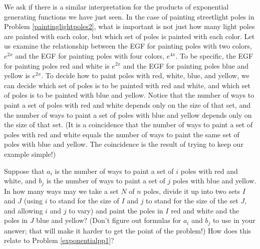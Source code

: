We ask if there is a similar
interpretation for the products of exponential generating functions we
have just seen.  In the case of painting streetlight poles in Problem
\ref{paintinglightpoles2}, what is important is not just how many
light poles are painted with each color, but which set of poles is painted
with each color.  Let us examine the relationship between the EGF for
painting poles with two colors, $e^{2x}$ and the EGF for painting poles
with four colors,
$e^{4x}$.  To be specific, the EGF for painting poles red and white is
$e^{2x}$ and the EGF for painting poles blue and yellow is $e^{2x}$.  To
decide how to paint poles with red, white, blue, and yellow, we can decide
which set of poles is to be painted with red and white, and which set of
poles is to be painted with blue and yellow.  Notice that the number of
ways to paint a set of poles with red and white depends only on the size
of that set, and the number of ways to paint a
set of poles with blue and yellow depends only on the size of that set. 
(It is a coincidence that the number of ways to paint a set of poles with
red and white equals the number of ways to paint the same set of poles
with blue and yellow.  The coincidence is the result of trying to keep our
example simple!)

\bp
\itemes Suppose that $a_i$ is the number of ways to paint a set of $i$
poles with red and white, and $b_j$ is the number of ways to paint a set
of
$j$ poles with blue and yellow.  In how many ways may we take a set $N$
of 
$n$ poles, divide it up into two sets $I$ and $J$ (using $i$ to stand for
the size of $I$ and $j$ to stand for the size of the set $J$, and
allowing $i$ and $j$ to vary) and paint the poles in $I$ red and white
and the poles in $J$ blue and yellow?  (Don't figure out formulas for
$a_i$ and $b_j$ to use in your answer; that will make it harder to get
the point of the problem!)  How does this relate to Problem
\ref{exponentialpp1}?\label{exponentialpp2}
\ep

